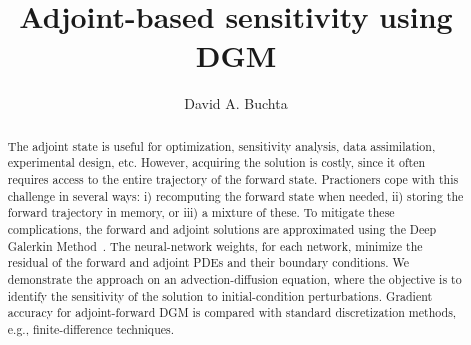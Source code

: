 \documentclass{jfm}
\title{Adjoint-based sensitivity using DGM}
\author{David A. Buchta}
\begin{document}
\maketitle

\begin{abstract}
 The adjoint state is useful for optimization, sensitivity analysis, data assimilation, experimental design, etc. However, acquiring the solution is costly, since it often requires access to the entire trajectory of the forward state. Practioners cope with this challenge in several ways: i) recomputing the forward state when needed, ii) storing the forward trajectory in memory, or iii) a mixture of these. To mitigate these complications, the forward and adjoint solutions are approximated using the Deep Galerkin Method~\citep{sirignano2018dgm}. The neural-network weights, for each network, minimize the residual of the forward and adjoint PDEs and their boundary conditions. We demonstrate the approach on an advection-diffusion equation, where the objective is to identify the sensitivity of the solution to initial-condition perturbations.  Gradient accuracy for adjoint-forward DGM is compared with standard discretization methods, e.g., finite-difference techniques. 
\end{abstract}

\vspace{-24pt}\makenomenclature
{}
\printnomenclature
\vspace{-6pt}
\end{document}
